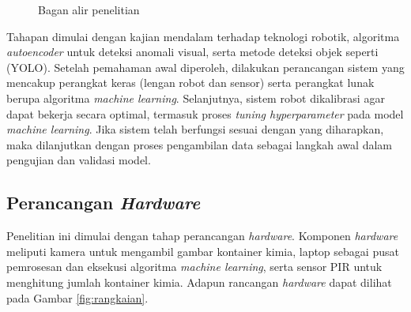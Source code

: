 \begin{figure}[H]
  \caption{Bagan alir penelitian}
  \label{fig:bagan-umum}
\end{figure}
\vspace{-1em}

Tahapan dimulai dengan kajian mendalam terhadap teknologi robotik,
algoritma \textit{autoencoder} untuk deteksi anomali visual, serta
metode deteksi objek seperti (YOLO).
Setelah pemahaman awal diperoleh, dilakukan
perancangan sistem yang mencakup perangkat keras (lengan robot dan
sensor) serta perangkat lunak berupa algoritma \textit{machine
learning}. Selanjutnya, sistem robot dikalibrasi agar dapat bekerja
secara optimal, termasuk proses \textit{tuning hyperparameter} pada
model \textit{machine learning}. Jika sistem telah berfungsi sesuai
dengan yang diharapkan, maka dilanjutkan dengan proses pengambilan data
sebagai langkah awal dalam pengujian dan validasi model.

\vspace{1em}

\subsection{Perancangan \textit{Hardware}}
Penelitian ini dimulai dengan tahap perancangan \textit{hardware}. Komponen
\textit{hardware} meliputi kamera untuk mengambil gambar
kontainer kimia, laptop sebagai pusat pemrosesan dan eksekusi
algoritma \textit{machine learning}, serta sensor PIR untuk menghitung
jumlah kontainer kimia. Adapun
rancangan \textit{hardware} dapat dilihat pada Gambar \ref{fig:rangkaian}.

